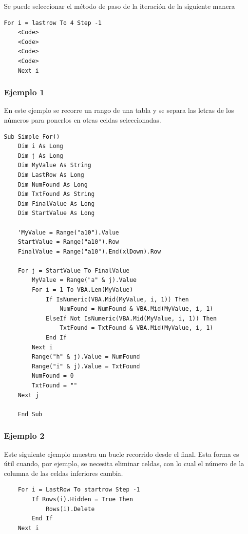 Se puede seleccionar el método de paso de la iteración de la siguiente manera

\begin{verbatim}
For i = lastrow To 4 Step -1
    <Code>
    <Code>
    <Code>
    <Code>
    Next i
\end{verbatim}


\subsubsection{Ejemplo 1}

En este ejemplo se recorre un rango de una tabla y se separa las letras de los números para ponerlos en otras celdas seleccionadas.

\begin{verbatim}
Sub Simple_For()
    Dim i As Long
    Dim j As Long
    Dim MyValue As String
    Dim LastRow As Long
    Dim NumFound As Long
    Dim TxtFound As String
    Dim FinalValue As Long
    Dim StartValue As Long
    
    'MyValue = Range("a10").Value
    StartValue = Range("a10").Row
    FinalValue = Range("a10").End(xlDown).Row
    
    For j = StartValue To FinalValue
        MyValue = Range("a" & j).Value
        For i = 1 To VBA.Len(MyValue)
            If IsNumeric(VBA.Mid(MyValue, i, 1)) Then
                NumFound = NumFound & VBA.Mid(MyValue, i, 1)
            ElseIf Not IsNumeric(VBA.Mid(MyValue, i, 1)) Then
                TxtFound = TxtFound & VBA.Mid(MyValue, i, 1)
            End If
        Next i
        Range("h" & j).Value = NumFound
        Range("i" & j).Value = TxtFound
        NumFound = 0
        TxtFound = ""
    Next j
    
    End Sub
\end{verbatim}


\subsubsection{Ejemplo 2}

Este siguiente ejemplo muestra un bucle recorrido desde el final. Esta forma es útil cuando, por ejemplo, se necesita eliminar celdas, con lo cual el número de la columna de las celdas inferiores cambia.

\begin{verbatim}
    For i = LastRow To startrow Step -1
        If Rows(i).Hidden = True Then
            Rows(i).Delete
        End If
    Next i
\end{verbatim}

